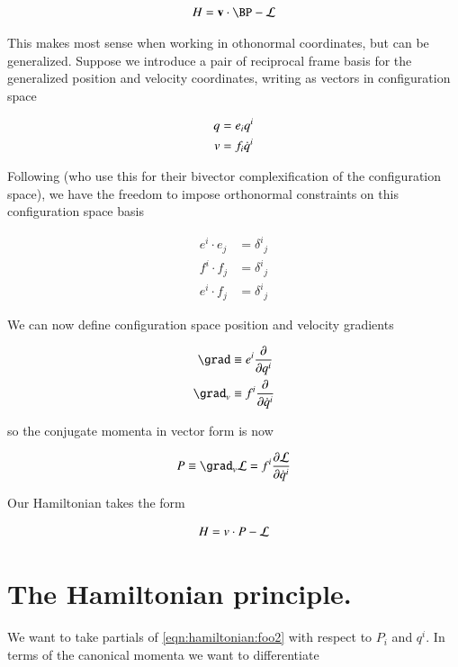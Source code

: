 \begin{align}\label{eqn:hamiltonian:foo3}
H = \Bv \cdot \BP - \LL
\end{align}

This makes most sense when working in othonormal coordinates, but can be generalized.  Suppose we introduce a pair of reciprocal frame basis for the generalized position and velocity coordinates, writing as vectors in configuration space

\begin{align}\label{eqn:hamiltonian:foo4}
q &= e_i q^i \\
v &= f_i \dot{q}^i 
\end{align}

Following \cite{doran2003gap} (who use this for their bivector complexification of the configuration space), we have the freedom to impose orthonormal constraints on this configuration space basis

\begin{align}\label{eqn:hamiltonian:foo5}
e^i \cdot e_j &= {\delta^i}_j \\
f^i \cdot f_j &= {\delta^i}_j \\
e^i \cdot f_j &= {\delta^i}_j
\end{align}

We can now define configuration space position and velocity gradients

\begin{align}\label{eqn:hamiltonian:foo6}
\grad &\equiv e^i \PD{q^i}{} \\
\grad_v &\equiv f^i \PD{\qdot^i}{}
\end{align}

so the conjugate momenta in vector form is now

\begin{align}\label{eqn:hamiltonian:foo7}
P \equiv \grad_v \LL = f^i \PD{\qdot^i}{\LL}
\end{align}

Our Hamiltonian takes the form

\begin{align}\label{eqn:hamiltonian:foo8}
H = v \cdot P - \mathcal{L}
\end{align}

\section{The Hamiltonian principle.}

We want to take partials of \ref{eqn:hamiltonian:foo2} with respect to $P_i$ and $q^i$.  In terms of the canonical momenta we want to differentiate

